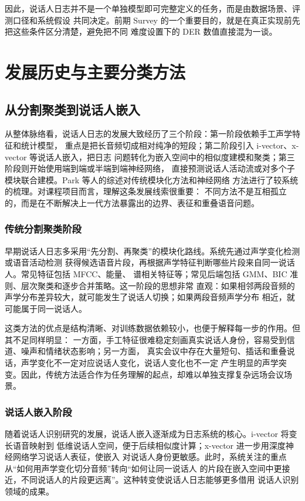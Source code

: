 \documentclass[UTF8,a4paper,10pt]{ctexart}
\begin{document}
因此，说话人日志并不是一个单独模型即可完整定义的任务，而是由数据场景、评测口径和系统假设
共同决定。前期 Survey 的一个重要目的，就是在真正实现前先把这些条件区分清楚，避免把不同
难度设置下的 DER 数值直接混为一谈。

\section{发展历史与主要分类方法}

\subsection{从分割聚类到说话人嵌入}

从整体脉络看，说话人日志的发展大致经历了三个阶段：第一阶段依赖手工声学特征和统计模型，
重点是把长音频切成相对纯净的短段；第二阶段引入 i-vector、x-vector 等说话人嵌入，把日志
问题转化为嵌入空间中的相似度建模和聚类；第三阶段则开始使用端到端或半端到端神经网络，
直接预测说话人活动流或对多个子模块联合建模。Park 等人的综述对传统模块化方法和神经网络
方法进行了较系统的梳理\cite{park2021review}。对课程项目而言，理解这条发展线索很重要：
不同方法不是互相孤立的，而是在不断解决上一代方法暴露出的边界、表征和重叠语音问题。

\subsubsection{传统分割聚类阶段}

早期说话人日志多采用“先分割、再聚类”的模块化路线。系统先通过声学变化检测或语音活动检测
获得候选语音片段，再根据声学特征判断哪些片段来自同一说话人。常见特征包括 MFCC、能量、
谱相关特征等；常见后端包括 GMM、BIC 准则、层次聚类和逐步合并策略。这一阶段的思想非常
直观：如果相邻两段音频的声学分布差异较大，就可能发生了说话人切换；如果两段音频声学分布
相近，就可能属于同一说话人。

这类方法的优点是结构清晰、对训练数据依赖较小，也便于解释每一步的作用。但其不足同样明显：
一方面，手工特征很难稳定刻画真实说话人身份，容易受到信道、噪声和情绪状态影响；另一方面，
真实会议中存在大量短句、插话和重叠说话，声学变化不一定对应说话人变化，说话人变化也不一定
产生明显的声学突变。因此，传统方法适合作为任务理解的起点，却难以单独支撑复杂远场会议场景。

\subsubsection{说话人嵌入阶段}

随着说话人识别研究的发展，说话人嵌入逐渐成为日志系统的核心。i-vector 将变长语音映射到
低维说话人空间，便于后续相似度计算；x-vector 进一步用深度神经网络学习说话人表征，使嵌入
对说话人身份更敏感。此时，系统关注的重点从“如何用声学变化切分音频”转向“如何让同一说话人
的片段在嵌入空间中更接近，不同说话人的片段更远离”。这种转变使说话人日志能够更多借用
说话人识别领域的成果。
\end{document}
